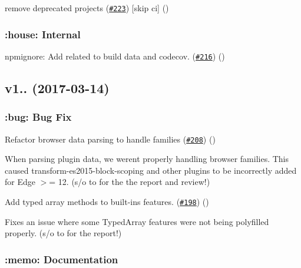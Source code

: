 \begin{DoxyItemize}
\item remove deprecated projects (\href{https://github.com/babel/babel-preset-env/pull/223}{\tt \#223}) \mbox{[}skip ci\mbox{]} ()
\end{DoxyItemize}

\subsubsection*{\+:house\+: Internal}


\begin{DoxyItemize}
\item npmignore\+: Add related to build data and codecov. (\href{https://github.com/babel/babel-preset-env/pull/216}{\tt \#216}) ()
\end{DoxyItemize}

\subsection*{v1.. (2017-\/03-\/14)}

\subsubsection*{\+:bug\+: Bug Fix}


\begin{DoxyItemize}
\item Refactor browser data parsing to handle families (\href{https://github.com/babel/babel-preset-env/pull/208}{\tt \#208}) ()
\end{DoxyItemize}

When parsing plugin data, we weren\textquotesingle{}t properly handling browser families. This caused {\ttfamily transform-\/es2015-\/block-\/scoping} and other plugins to be incorrectly added for Edge $>$= 12. (s/o to  for the the report and review!)


\begin{DoxyItemize}
\item Add typed array methods to built-\/ins features. (\href{https://github.com/babel/babel-preset-env/pull/198}{\tt \#198}) ()
\end{DoxyItemize}

Fixes an issue where some Typed\+Array features were not being polyfilled properly. (s/o to  for the report!)

\subsubsection*{\+:memo\+: Documentation}


